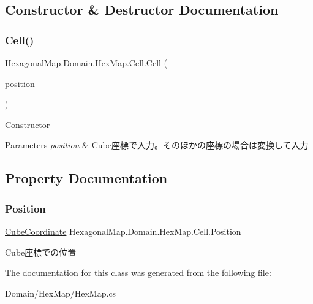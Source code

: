 \subsection{Constructor \& Destructor Documentation}
\mbox{\label{class_hexagonal_map_1_1_domain_1_1_hex_map_1_1_cell_a1508e9283829797d14a33ea1f945e6bc}} 
\subsubsection{\texorpdfstring{Cell()}{Cell()}}
{\footnotesize\ttfamily Hexagonal\+Map.\+Domain.\+Hex\+Map.\+Cell.\+Cell (\begin{DoxyParamCaption}\item[{\mbox{\hyperlink{struct_hexagonal_map_1_1_domain_1_1_hex_map_1_1_cube_coordinate}{Cube\+Coordinate}}}]{position }\end{DoxyParamCaption})\hspace{0.3cm}{\ttfamily [inline]}}



Constructor 


\begin{DoxyParams}{Parameters}
{\em position} & Cube座標で入力。そのほかの座標の場合は変換して入力\\
\hline
\end{DoxyParams}


\subsection{Property Documentation}
\mbox{\label{class_hexagonal_map_1_1_domain_1_1_hex_map_1_1_cell_a4012ce403bf927c7f693b4e6db8a878a}} 
\subsubsection{\texorpdfstring{Position}{Position}}
{\footnotesize\ttfamily \mbox{\hyperlink{struct_hexagonal_map_1_1_domain_1_1_hex_map_1_1_cube_coordinate}{Cube\+Coordinate}} Hexagonal\+Map.\+Domain.\+Hex\+Map.\+Cell.\+Position\hspace{0.3cm}{\ttfamily [get]}}



Cube座標での位置 



The documentation for this class was generated from the following file\+:\begin{DoxyCompactItemize}
\item 
Domain/\+Hex\+Map/Hex\+Map.\+cs\end{DoxyCompactItemize}
